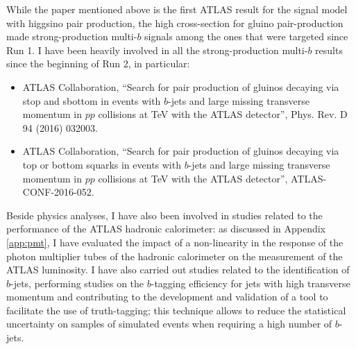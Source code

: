 \documentclass[10pt,a4paper]{article}
\begin{document}
While the paper mentioned above is the first ATLAS result for the signal model with higgsino pair production, 
the high cross-section for gluino pair-production made strong-production multi-$b$ signals among the ones that were targeted since Run 1. 
I have been heavily involved in all the strong-production multi-$b$ results since the beginning of Run 2, in particular:

\begin{itemize}
\item ATLAS Collaboration, ``Search for pair production of gluinos decaying via stop and sbottom in events with $b$-jets and large missing transverse momentum in $pp$ collisions at \cmtre TeV with the ATLAS detector'', Phys. Rev. D 94 (2016) 032003.
\item ATLAS Collaboration, ``Search for pair production of gluinos decaying via top or bottom squarks in events with $b$-jets and large missing transverse momentum in
$pp$ collisions at \cmtre TeV with the ATLAS detector'', ATLAS-CONF-2016-052.
\end{itemize}

Beside physics analyses, I have also been involved in studies related to the performance of the ATLAS hadronic calorimeter: 
as discussed in Appendix \ref{app:pmt}, I have evaluated the impact of a non-linearity in the response of the photon multiplier tubes of the 
hadronic calorimeter on the measurement of the ATLAS luminosity. 
I have also carried out studies related to the identification of $b$-jets, 
performing studies on the $b$-tagging efficiency for jets with high transverse momentum and contributing to 
the development and validation of a tool to facilitate the use of truth-tagging; this technique 
allows to reduce the statistical uncertainty on samples of simulated events when requiring a high number of $b$-jets. 
\end{document}
